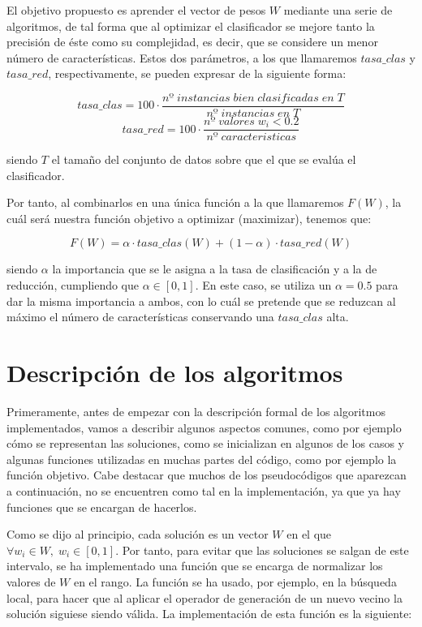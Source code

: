 \documentclass[11pt,a4paper]{article}
\begin{document}
El objetivo propuesto es aprender el vector de pesos $W$
mediante una serie de algoritmos, de tal forma que al optimizar el clasificador se mejore tanto la precisión de éste como su
complejidad, es decir, que se considere un menor número de características. Estos dos parámetros, a los que llamaremos $tasa\_
clas$ y $tasa\_red$, respectivamente, se pueden expresar de la siguiente forma:

\[tasa\_clas = 100 \cdot \frac{nº \; instancias \; bien \; clasificadas \; en \; T}{nº \; instancias \; en \; T}\]
\[tasa\_red = 100 \cdot \frac{nº \; valores \; w_i < 0.2}{nº \; caracteristicas}\]

\noindent siendo $T$ el tamaño del conjunto de datos sobre que el que se evalúa el clasificador.\par

Por tanto, al combinarlos en una única función a la que llamaremos $F(W)$, la cuál será nuestra función objetivo a optimizar
(maximizar), tenemos que:

\[F(W) = \alpha \cdot tasa\_clas(W) + (1 - \alpha) \cdot tasa\_red(W)\] 

\noindent siendo $\alpha$ la importancia que se le asigna a la tasa de clasificación y a la de reducción, cumpliendo que
$\alpha \in [0, 1]$. En este caso, se utiliza un $\alpha = 0.5$ para dar la misma importancia a ambos, con lo cuál se pretende
que se reduzcan al máximo el número de características conservando una $tasa\_clas$ alta.

\section{Descripción de los algoritmos}

Primeramente, antes de empezar con la descripción formal de los algoritmos implementados, vamos a describir algunos aspectos
comunes, como por ejemplo cómo se representan las soluciones, como se inicializan en algunos de los casos y algunas funciones
utilizadas en muchas partes del código, como por ejemplo la función objetivo. Cabe destacar que muchos de los pseudocódigos
que aparezcan a continuación, no se encuentren como tal en la implementación, ya que ya hay funciones que se encargan de
hacerlos.

Como se dijo al principio, cada solución es un vector $W$ en el que $\forall w_i \in W, \; w_i \in [0, 1]$. Por tanto, para
evitar que las soluciones se salgan de este intervalo, se ha implementado una función que se encarga de normalizar los valores
de $W$ en el rango. La función se ha usado, por ejemplo, en la búsqueda local, para hacer que al aplicar el operador
de generación de un nuevo vecino la solución siguiese siendo válida. La implementación de esta función es la siguiente:
\end{document}
